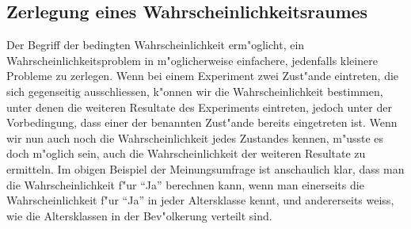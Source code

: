 \subsection{Zerlegung eines Wahrscheinlichkeitsraumes}
Der
Begriff der bedingten Wahrscheinlichkeit erm"oglicht,
ein Wahrscheinlichkeitsproblem in m"oglicherweise einfachere, jedenfalls
kleinere Probleme zu zerlegen.
Wenn bei einem Experiment zwei Zust"ande
eintreten, die sich gegenseitig ausschliessen, k"onnen wir die 
Wahrscheinlichkeit bestimmen, unter denen die weiteren Resultate
des Experiments eintreten, jedoch unter der Vorbedingung, dass einer
der benannten Zust"ande bereits eingetreten ist.
Wenn wir nun auch
noch die Wahrscheinlichkeit jedes Zustandes kennen, m"usste es doch
m"oglich sein, auch die Wahrscheinlichkeit der weiteren Resultate zu
ermitteln.
Im obigen Beispiel der Meinungsumfrage ist anschaulich klar, dass man die
Wahrscheinlichkeit f"ur ``Ja'' berechnen kann, wenn man einerseits die
Wahrscheinlichkeit f"ur ``Ja'' in  jeder Altersklasse kennt, und andererseits
weiss, wie die Altersklassen in der Bev"olkerung verteilt sind.

